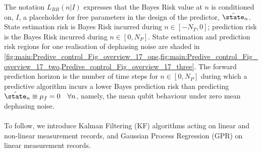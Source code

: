 The notation $L_{BR}(n | I)$ expresses that the Bayes Risk value at $n$ is conditioned on, $I$, a placeholder for free parameters in the design of the predictor,  $\hat{\state}_n$. State estimation risk is Bayes Risk incurred during $n \in [-N_T, 0]$; prediction risk is the Bayes Risk incurred during $n \in [0, N_P]$. State estimation and prediction risk regions for one realisation of dephasing noise are shaded in \cref{fig:main:Predive_control_Fig_overview_17_one,fig:main:Predive_control_Fig_overview_17_two,Predive_control_Fig_overview_17_three}.  The forward prediction horizon is the number of time steps for $ n \in [0, N_P]$ during which a predictive algorithm incurs a lower Bayes prediction risk than predicting $\hat{\state}_n \equiv \mu_f = 0 \quad \forall n$, namely, the mean qubit behaviour under zero mean dephasing noise. %
\\
\\
To follow, we introduce Kalman Filtering (KF) algorithms acting on linear and non-linear measurement records, and Gaussian Process Regression (GPR) on linear measurement records. 
